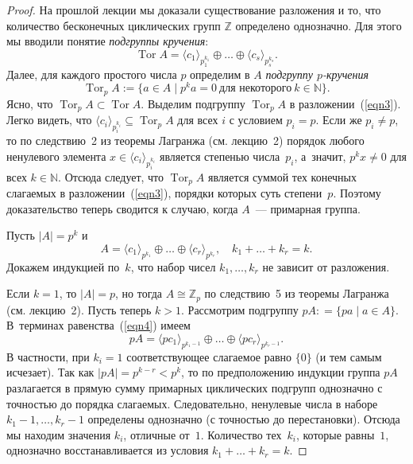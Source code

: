 \documentclass[a4paper,10pt]{amsart}
\DeclareMathOperator{\Tor}{\mathrm{Tor}}
\def\ZZ{{\mathbb Z}}%
\def\NN{{\mathbb N}}%
\theoremstyle{definition}
\theoremstyle{remark}
\begin{document}
\begin{proof}
На прошлой лекции мы доказали существование разложения и то, что количество
бесконечных циклических групп $\ZZ$ определено однозначно. Для этого мы вводили
понятие \textit{подгруппы кручения}:
\begin{equation} \label{eqn3}
\Tor A = \langle c_1 \rangle_{p_1^{k_1}} \oplus \ldots \oplus
\langle c_s \rangle_{p_s^{k_s}}.
\end{equation}
Далее, для каждого простого числа $p$ определим в $A$ {\it подгруппу
$p$-кручения}
\begin{equation} \label{eqn4}
\Tor_p A := \{ a\in A \mid p^ka=0 \ \text{для некоторого} \ k \in
\NN \}.
\end{equation}
Ясно, что $\Tor_p A \subset \Tor A$. Выделим подгруппу $\Tor_p A$ в
разложении~(\ref{eqn3}). Легко видеть, что $\langle c_i
\rangle_{p_i^{k_i}} \subseteq \Tor_p A$ для всех $i$ с условием $p_i
= p$. Если же $p_i \ne p$, то по следствию~2 из теоремы Лагранжа
(см. лекцию~2) порядок любого ненулевого элемента $x \in \langle c_i
\rangle_{p_i^{k_i}}$ является степенью числа~$p_i$, а~значит, $p^k x
\ne 0$ для всех $k \in \NN$. Отсюда следует, что $\Tor_p A$ является
суммой тех конечных слагаемых в разложении~(\ref{eqn3}), порядки
которых суть степени~$p$. Поэтому доказательство теперь сводится к
случаю, когда $A$~--- примарная группа.

Пусть $|A|=p^k$ и
$$
A = \langle c_1\rangle_{p^{k_1}}\oplus\ldots\oplus\langle
c_r\rangle_{p^{k_r}}, \quad k_1+\ldots+k_r=k.
$$
Докажем индукцией по~$k$, что набор чисел $k_1, \ldots, k_r$ не
зависит от разложения.

Если $k = 1$, то $|A| = p$, но тогда $A \cong \ZZ_p$ по следствию~5
из теоремы Лагранжа (см. лекцию~2). Пусть теперь $k > 1$. Рассмотрим
подгруппу $pA: = \{ pa \mid a \in A \}$. В~терминах
равенства~(\ref{eqn4}) имеем
$$
pA = \langle pc_1 \rangle_{p^{k_1-1}} \oplus \ldots \oplus \langle
pc_r\rangle_{p^{k_r-1}}.
$$
В частности, при $k_i = 1$ соответствующее слагаемое равно $\lbrace
0 \rbrace$ (и тем самым исчезает). Так как $|pA| = p^{k - r} < p^k$,
то по предположению индукции группа $pA$ разлагается в прямую сумму
примарных циклических подгрупп однозначно с точностью до порядка
слагаемых. Следовательно, ненулевые числа в наборе $k_1 - 1, \ldots,
k_r-1$ определены однозначно (с точностью до перестановки). Отсюда
мы находим значения $k_i$, отличные от~$1$. Количество тех~$k_i$,
которые равны~$1$, однозначно восстанавливается из условия $k_1 +
\ldots + k_r = k$.
\end{proof}
\end{document}
